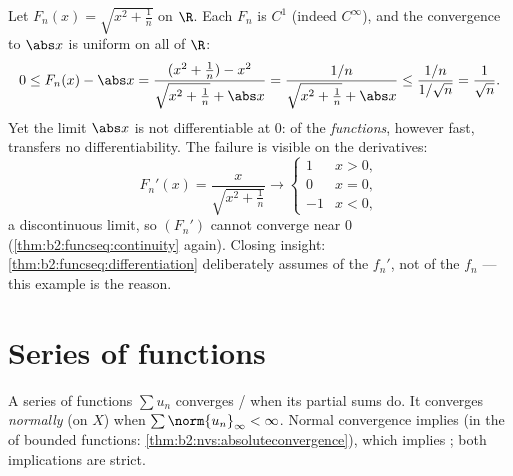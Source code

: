 \begin{example}\label{ex:b2:funcseq:sqrtabs}
Let $F_n(x) = \sqrt{x^2 + \frac1n}$ on $\R$. Each $F_n$ is
$C^1$ (indeed $C^\infty$), and the convergence to $\abs x$ is
uniform on all of $\R$:
\[
0 \leq F_n(x) - \abs x
= \frac{(x^2 + \frac1n) - x^2}{\sqrt{x^2+\frac1n} + \abs x}
= \frac{1/n}{\sqrt{x^2 + \frac1n} + \abs x}
\leq \frac{1/n}{1/\sqrt n} = \frac{1}{\sqrt n} .
\]
Yet the limit $\abs x$ is not differentiable at $0$:  of the \emph{functions}, however fast, transfers no
differentiability. The failure is visible on the derivatives:
\[
F_n'(x) = \frac{x}{\sqrt{x^2 + \frac1n}}
\longrightarrow \begin{cases} 1 & x > 0,\\ 0 & x = 0,\\
-1 & x < 0, \end{cases}
\]
a discontinuous  limit, so $(F_n')$ cannot converge
 near $0$ (\cref{thm:b2:funcseq:continuity} again).
Closing insight:
\cref{thm:b2:funcseq:differentiation} deliberately assumes
 of the $f_n'$, not of the $f_n$ ---
this example is the reason.
\end{example}

\section{Series of functions}

\begin{definition}\label{def:b2:funcseq:series}
A series of functions $\sum u_n$ converges / when
its partial sums do. It converges
\emph{normally} (on $X$) when $\sum
\norm{u_n}_\infty < \infty$. Normal convergence implies  (in the  of bounded functions:
\cref{thm:b2:nvs:absoluteconvergence}), which implies ;
both implications are strict.
\end{definition}

